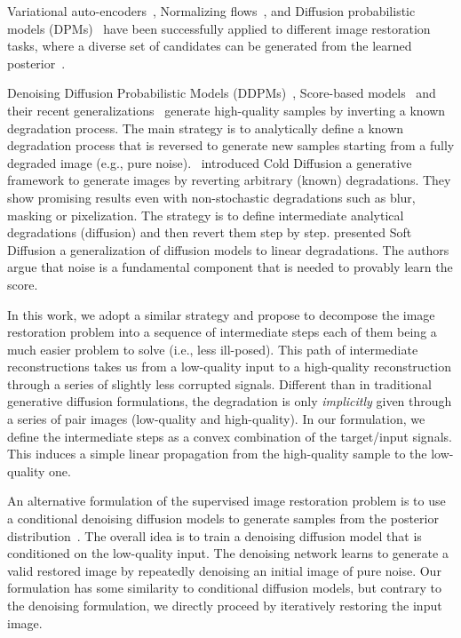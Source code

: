 \documentclass[10pt]{article} %
\begin{document}
Variational auto-encoders~\citep{prakash2020fully}, Normalizing flows~\citep{lugmayr2020srflow,lugmayr2021ntire}, and Diffusion probabilistic models (DPMs)~\citep{saharia2021image,li2021srdiff,whang2022deblurring} have been successfully applied to different image restoration tasks, where a diverse set of candidates can be generated from the learned posterior~\citep{prakash2020fully}.

Denoising Diffusion Probabilistic Models (DDPMs)~\citep{sohl2015deep, ho2020denoising, song2021denoising}, Score-based models~\citep{ncsn, ncsnv2, ncsnv3} and their recent generalizations~\citep{bansal2022cold, hoogeboom2022blurring, daras2023soft, deasy2021heavy, hoogeboom2022autoregressive, hoogeboom2022equivariant, nachmani2021denoising, johnson2021beyond, lee2022progressive, ye2022hitting} generate high-quality samples by inverting a known degradation process. The main strategy is to analytically define a known degradation process that is reversed to generate new samples starting from a fully degraded image (e.g., pure noise). 
\citet{bansal2022cold}~introduced Cold Diffusion a generative framework to generate images by reverting arbitrary (known) degradations. They show promising results even with non-stochastic degradations such as blur, masking or pixelization. The strategy is to define intermediate analytical degradations (diffusion) and then revert them step by step. \citet{daras2023soft} presented Soft Diffusion a generalization of diffusion models to linear degradations. The authors argue that noise is a fundamental component that is needed to provably learn the score.

In this work, we adopt a similar strategy and propose to decompose the image restoration problem into a sequence of intermediate steps each of them being a much easier problem to solve (i.e., less ill-posed). This path of intermediate reconstructions takes us from a low-quality input to a high-quality reconstruction through a series of slightly less corrupted signals. Different than in traditional generative diffusion formulations, the degradation is only \emph{implicitly} given through a series of pair images (low-quality and high-quality). In our formulation, we define the intermediate steps as a convex combination of the target/input signals. This induces a simple linear propagation from the high-quality sample to the low-quality one. 

An alternative formulation of the supervised image restoration problem is to use a conditional denoising diffusion models to generate samples from the posterior distribution~\citep{li2021srdiff,saharia2021image,saharia2022palette,whang2022deblurring}. The overall idea is to train a denoising diffusion model that is conditioned on the low-quality input. The denoising network learns to generate a valid restored image  by repeatedly denoising an initial image of pure noise. Our formulation has some similarity to conditional diffusion models, but contrary to the denoising formulation, we directly proceed by iteratively restoring the input image. 
\end{document}
